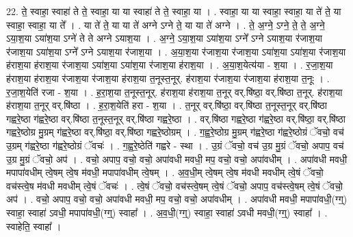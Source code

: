 \documentclass[17pt]{extarticle}
\begin{document}
22. ते॒ स्वाहा॒ स्वाहा॑ ते ते॒ स्वाहा॒ या या स्वाहा॑ ते ते॒ स्वाहा॒ या । . स्वाहा॒ या या स्वाहा॒ स्वाहा॒ या ते॑ ते॒ या स्वाहा॒ स्वाहा॒ या ते᳚ । . या ते॑ ते॒ या या ते॑ अग्ने ऽग्ने ते॒ या या ते॑ अग्ने । . ते॒ अ॒ग्ने॒ ऽग्ने॒ ते॒ ते॒ अ॒ग्ने॒ ऽया॒श॒या ऽया॑श॒या ऽग्ने॑ ते ते अग्ने ऽयाश॒या । . अ॒ग्ने॒ ऽया॒श॒या ऽया॑श॒या ऽग्ने᳚ ऽग्ने ऽयाश॒या र॑जाश॒या र॑जाश॒या ऽया॑श॒या ऽग्ने᳚ ऽग्ने ऽयाश॒या र॑जाश॒या । . अ॒या॒श॒या र॑जाश॒या र॑जाश॒या ऽया॑श॒या ऽया॑श॒या र॑जाश॒या ह॑राश॒या ह॑राश॒या र॑जाश॒या ऽया॑श॒या ऽया॑श॒या र॑जाश॒या ह॑राश॒या । . अ॒या॒श॒येत्य॑या - श॒या । . र॒जा॒श॒या ह॑राश॒या ह॑राश॒या र॑जाश॒या र॑जाश॒या ह॑राश॒या त॒नूस्त॒नूर्. ह॑राश॒या र॑जाश॒या र॑जाश॒या ह॑राश॒या त॒नूः । . र॒जा॒श॒येति॑ रजा - श॒या । . ह॒रा॒श॒या त॒नूस्त॒नूर्. ह॑राश॒या ह॑राश॒या त॒नूर् वर्.षि॑ष्ठा॒ वर्.षि॑ष्ठा त॒नूर्. ह॑राश॒या ह॑राश॒या त॒नूर् वर्.षि॑ष्ठा । . ह॒रा॒श॒येति॑ हरा - श॒या । . त॒नूर् वर्.षि॑ष्ठा॒ वर्.षि॑ष्ठा त॒नूस्त॒नूर् वर्.षि॑ष्ठा गह्वरे॒ष्ठा ग॑ह्वरे॒ष्ठा वर्.षि॑ष्ठा त॒नूस्त॒नूर् वर्.षि॑ष्ठा गह्वरे॒ष्ठा । . वर्.षि॑ष्ठा गह्वरे॒ष्ठा ग॑ह्वरे॒ष्ठा वर्.षि॑ष्ठा॒ वर्.षि॑ष्ठा गह्वरे॒ष्ठोग्र मु॒ग्रम् ग॑ह्वरे॒ष्ठा वर्.षि॑ष्ठा॒ वर्.षि॑ष्ठा गह्वरे॒ष्ठोग्रम् । . ग॒ह्व॒रे॒ष्ठोग्र मु॒ग्रम् ग॑ह्वरे॒ष्ठा ग॑ह्वरे॒ष्ठोग्रं ॅवचो॒ वच॑ उ॒ग्रम् ग॑ह्वरे॒ष्ठा ग॑ह्वरे॒ष्ठोग्रं ॅवचः॑ । . ग॒ह्व॒रे॒ष्ठेति॑ गह्वरे - स्था । . उ॒ग्रं ॅवचो॒ वच॑ उ॒ग्र मु॒ग्रं ॅवचो॒ अपाप॒ वच॑ उ॒ग्र मु॒ग्रं ॅवचो॒ अप॑ । . वचो॒ अपाप॒ वचो॒ वचो॒ अपा॑वधी मवधी॒ मप॒ वचो॒ वचो॒ अपा॑वधीम् । . अपा॑वधी मवधी॒ मपापा॑वधीम् त्वे॒षम् त्वे॒ष म॑वधी॒ मपापा॑वधीम् त्वे॒षम् । . अ॒व॒धी॒म् त्वे॒षम् त्वे॒ष म॑वधी मवधीम् त्वे॒षं ॅवचो॒ वच॑स्त्वे॒ष म॑वधी मवधीम् त्वे॒षं ॅवचः॑ । . त्वे॒षं ॅवचो॒ वच॑स्त्वे॒षम् त्वे॒षं ॅवचो॒ अपाप॒ वच॑स्त्वे॒षम् त्वे॒षं ॅवचो॒ अप॑ । . वचो॒ अपाप॒ वचो॒ वचो॒ अपा॑वधी मवधी॒ मप॒ वचो॒ वचो॒ अपा॑वधीम् । . अपा॑वधी मवधी॒ मपापा॑वधी॒(ग्ग्॒) स्वाहा॒ स्वाहा॑ ऽवधी॒ मपापा॑वधी॒(ग्ग्॒) स्वाहा᳚ । . अ॒व॒धी॒(ग्ग्॒) स्वाहा॒ स्वाहा॑ ऽवधी मवधी॒(ग्ग्॒) स्वाहा᳚ । . स्वाहेति॒ स्वाहा᳚ । \newline
\pagebreak
{}
\end{document}
